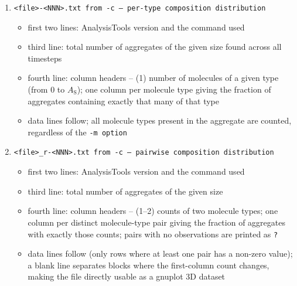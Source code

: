 \begin{enumerate}[nosep,leftmargin=20pt]
\begin{itemize}[nosep,leftmargin=5pt]
\begin{itemize}[nosep,leftmargin=10pt]
          \item \tt{As}: aggregate size
          \item \tt{F_n(As)}, \tt{F_w(As)}, \tt{F_z(As)}: number, weight,
            and z distribution functions (Eq.~\eqref{eq:Fnwz}); two columns
            for \tt{F_w(As)} and \tt{F_z(As)}, one per mass definition
          \item \tt{n_agg}: total count of aggregates of this size across all
            timesteps
          \item \tt{<name>_n} for each molecule type: average count of that
            type in an aggregate of this size
        \end{itemize}
      \item fourth line: note explaining the partial/total mass distinction
      \item data lines follow; only sizes observed at least once are written
      \item last two lines: same overall averages as in \tt{-a}
    \end{itemize}
  \item \tt{<file>-<NNN>.txt} from \tt{-c} -- per-type composition distribution
    \begin{itemize}[nosep,leftmargin=5pt]
      \item first two lines: AnalysisTools version and the command used
      \item third line: total number of aggregates of the given size found
        across all timesteps
      \item fourth line: column headers -- (1) number of molecules of a given
        type (from 0 to $A_\text{S}$); one column per molecule type giving
        the fraction of aggregates containing exactly that many of that type
      \item data lines follow; all molecule types present in the aggregate
        are counted, regardless of the \tt{-m} option
    \end{itemize}
  \item \tt{<file>_r-<NNN>.txt} from \tt{-c} -- pairwise composition distribution
    \begin{itemize}[nosep,leftmargin=5pt]
      \item first two lines: AnalysisTools version and the command used
      \item third line: total number of aggregates of the given size
      \item fourth line: column headers -- (1--2) counts of two molecule
        types; one column per distinct molecule-type pair giving the fraction
        of aggregates with exactly those counts; pairs with no observations
        are printed as \tt{?}
      \item data lines follow (only rows where at least one pair has a
        non-zero value); a blank line separates blocks where the first-column
        count changes, making the file directly usable as a gnuplot 3D dataset
    \end{itemize}
\end{enumerate}

